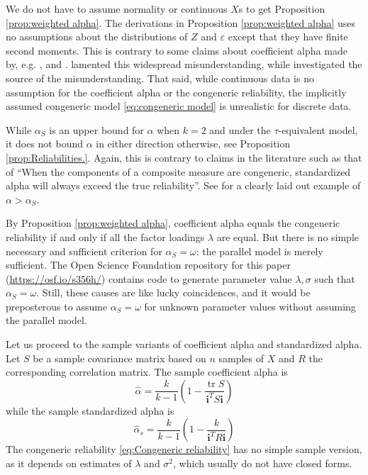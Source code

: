 \documentclass[twoside]{article}
\DeclareMathOperator{\tr}{tr}
\begin{document}
\begin{rem}
We do not have to assume normality or continuous $X$s to get Proposition \ref{prop:weighted alpha}. The derivations in Proposition \ref{prop:weighted alpha} uses no assumptions about the distributions of $Z$ and $\varepsilon$ except that they have finite second moments. This is contrary to some claims about coefficient alpha made by, e.g. \citet[][p.415]{McNeish2018-vu}, \citet[][p.21]{Zumbo2007-ap} and \citet[][p. 1185]{Zumbo2019-lm}. \citet{Raykov2019-yr} lamented this widespread misunderstanding, while \citet[][p. 1060]{Chalmers2018-fj} investigated the source of the misunderstanding. That said, while continuous data is no assumption for the coefficient alpha or the congeneric reliability, the implicitly assumed congeneric model \eqref{eq:congeneric model} is unrealistic for discrete data. 
\end{rem}
\begin{rem}
While $\alpha_S$ is an upper bound for $\alpha$ when $k = 2$ and under the $\tau$-equivalent model, it does not bound $\alpha$ in either direction otherwise, see Proposition \ref{prop:Reliabilities.}. Again, this is contrary to claims in the literature such as that of \citet[][p.348]{Osburn2000-jd} \enquote{When the components of a composite measure are congeneric, standardized alpha will always exceed the true reliability}. See \citep[][p.450]{Falk2011-ae} for a clearly laid out example of $\alpha>\alpha_S$.
\end{rem}

By Proposition \ref{prop:weighted alpha}, coefficient alpha equals the congeneric reliability if and only if all the factor loadings $\lambda$ are equal. But there is no simple necessary and sufficient criterion for $\alpha_S = \omega$: the parallel model is merely sufficient. The Open Science Foundation repository for this paper (\url{https://osf.io/s356h/}) contains code to generate parameter value $\lambda,\sigma$ such that $\alpha_S = \omega$. Still, these causes are like lucky coincidences, and it would be preposterous to assume $\alpha_S = \omega$ for unknown parameter values without assuming the parallel model.

Let us proceed to the sample variants of coefficient alpha and standardized
alpha. Let $S$ be a sample covariance matrix based on
$n$ samples of $X$ and $R$ the corresponding correlation matrix.
The sample coefficient alpha is 
\begin{equation}
\hat{\alpha}=\frac{k}{k-1}\left(1-\frac{\tr{S}}{\mathbf{i}^{T}S\mathbf{i}}\right)\label{eq:sample coefficient alpha}
\end{equation}
while the sample standardized alpha is
\begin{equation}
\hat{\alpha}_s=\frac{k}{k-1}\left(1-\frac{k}{\mathbf{i}^{T}R\mathbf{i}}\right)\label{eq:sample standardized alpha}
\end{equation}
The congeneric reliability \eqref{eq:Congeneric reliability} has no
simple sample version, as it depends on estimates of $\lambda$ and
$\sigma^2$, which usually do not have closed forms.
\end{document}
